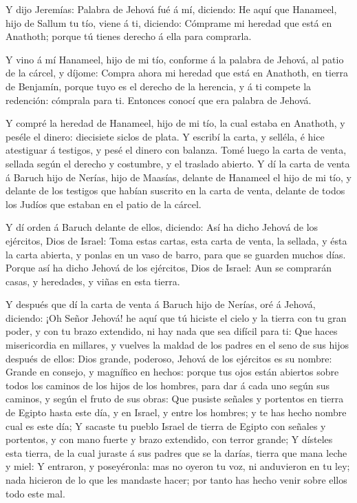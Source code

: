  Y dijo Jeremías: Palabra de Jehová fué á mí, diciendo:
 He aquí que Hanameel, hijo de Sallum tu tío, viene á ti,
diciendo: Cómprame mi heredad que está en Anathoth; porque tú tienes
derecho á ella para comprarla.

 Y vino á mí Hanameel, hijo de mi tío, conforme á la palabra
de Jehová, al patio de la cárcel, y díjome: Compra ahora mi heredad que
está en Anathoth, en tierra de Benjamín, porque tuyo es el derecho de la
herencia, y á ti compete la redención: cómprala para ti. Entonces conocí
que era palabra de Jehová.

 Y compré la heredad de Hanameel, hijo de mi tío, la cual
estaba en Anathoth, y peséle el dinero: diecisiete siclos de plata.
 Y escribí la carta, y selléla, é hice atestiguar á
testigos, y pesé el dinero con balanza.  Tomé luego la
carta de venta, sellada según el derecho y costumbre, y el traslado
abierto.  Y dí la carta de venta á Baruch hijo de Nerías,
hijo de Maasías, delante de Hanameel el hijo de mi tío, y delante de los
testigos que habían suscrito en la carta de venta, delante de todos los
Judíos que estaban en el patio de la cárcel.

 Y dí orden á Baruch delante de ellos, diciendo:
 Así ha dicho Jehová de los ejércitos, Dios de Israel: Toma
estas cartas, esta carta de venta, la sellada, y ésta la carta abierta,
y ponlas en un vaso de barro, para que se guarden muchos días.
 Porque así ha dicho Jehová de los ejércitos, Dios de
Israel: Aun se comprarán casas, y heredades, y viñas en esta tierra.

 Y después que dí la carta de venta á Baruch hijo de
Nerías, oré á Jehová, diciendo:  ¡Oh Señor Jehová! he aquí
que tú hiciste el cielo y la tierra con tu gran poder, y con tu brazo
extendido, ni hay nada que sea difícil para ti:  Que haces
misericordia en millares, y vuelves la maldad de los padres en el seno
de sus hijos después de ellos: Dios grande, poderoso, Jehová de los
ejércitos es su nombre:  Grande en consejo, y magnífico en
hechos: porque tus ojos están abiertos sobre todos los caminos de los
hijos de los hombres, para dar á cada uno según sus caminos, y según el
fruto de sus obras:  Que pusiste señales y portentos en
tierra de Egipto hasta este día, y en Israel, y entre los hombres; y te
has hecho nombre cual es este día;  Y sacaste tu pueblo
Israel de tierra de Egipto con señales y portentos, y con mano fuerte y
brazo extendido, con terror grande;  Y dísteles esta
tierra, de la cual juraste á sus padres que se la darías, tierra que
mana leche y miel:  Y entraron, y poseyéronla: mas no
oyeron tu voz, ni anduvieron en tu ley; nada hicieron de lo que les
mandaste hacer; por tanto has hecho venir sobre ellos todo este mal.

